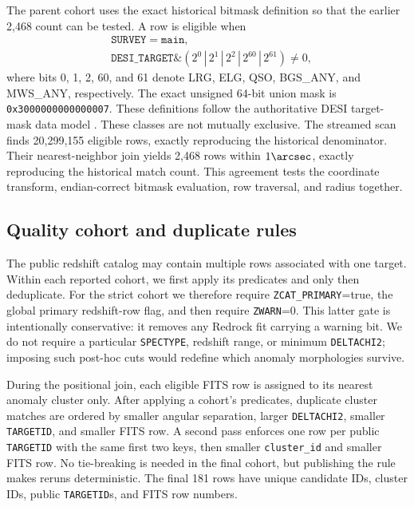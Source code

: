 \documentclass[twocolumn,linenumbers]{aastex702}
\begin{document}
The parent cohort uses the exact historical bitmask definition so that the earlier 2,468 count
can be tested.  A row is eligible when
\begin{equation}
\begin{split}
&\texttt{SURVEY}=\texttt{main},\\
&\texttt{DESI\_TARGET}\mathbin{\&}
\left(2^0\,|\,2^1\,|\,2^2\,|\,2^{60}\,|\,2^{61}\right)\ne0,
\end{split}
\end{equation}
where bits 0, 1, 2, 60, and 61 denote LRG, ELG, QSO, BGS\_ANY, and MWS\_ANY, respectively.
The exact unsigned 64-bit union mask is \texttt{0x3000000000000007}.
These definitions follow the authoritative DESI target-mask data model \citep{DESIBitmasks}.
These classes are not mutually exclusive.  The streamed scan finds 20,299,155 eligible rows,
exactly reproducing the historical denominator.  Their nearest-neighbor join yields 2,468 rows
within $1\arcsec$, exactly reproducing the historical match count.  This agreement tests the
coordinate transform, endian-correct bitmask evaluation, row traversal, and radius together.

\subsection{Quality cohort and duplicate rules}\label{sec:quality-selection}

The public redshift catalog may contain multiple rows associated with one target.  Within each
reported cohort, we first apply its predicates and only then deduplicate.  For the strict cohort
we therefore require \texttt{ZCAT\_PRIMARY}=true, the global primary redshift-row flag, and then
require
\texttt{ZWARN}=0.  This latter gate is intentionally conservative: it removes any Redrock fit
carrying a warning bit.  We do not require a particular \texttt{SPECTYPE}, redshift range, or
minimum \texttt{DELTACHI2}; imposing such post-hoc cuts would redefine which anomaly morphologies
survive.

During the positional join, each eligible FITS row is assigned to its nearest anomaly cluster
only.  After applying a cohort's predicates, duplicate cluster matches are ordered by smaller angular separation, larger
\texttt{DELTACHI2}, smaller \texttt{TARGETID}, and smaller FITS row.  A second pass enforces one
row per public \texttt{TARGETID} with the same first two keys, then smaller \texttt{cluster\_id}
and smaller FITS row.  No tie-breaking is needed in the final
cohort, but publishing the rule makes reruns deterministic.  The final 181 rows have unique
candidate IDs, cluster IDs, public \texttt{TARGETID}s, and FITS row numbers.
\end{document}
